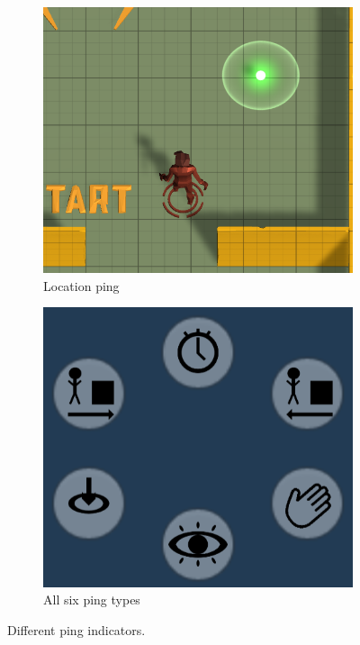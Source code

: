 \begin{figure}[h!]
    \centering
    \begin{subfigure}[b]{0.4\linewidth}
        \includegraphics[width=\linewidth]{images/location_ping.png}
        \caption{Location ping}
        \label{fig:location ping}
      \end{subfigure}
    \begin{subfigure}[b]{0.4\linewidth}
        \includegraphics[width=\linewidth]{images/ping_types.png}
        \caption{All six ping types}
        \label{fig:ping types}
    \end{subfigure}
    \caption{
    Different ping indicators.}
\end{figure}

